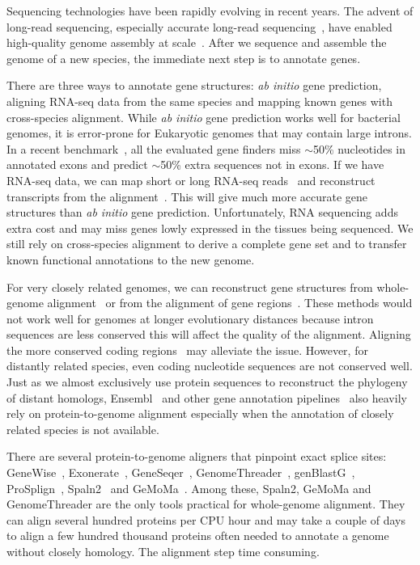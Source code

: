 \documentclass{bioinfo}
\begin{document}
Sequencing technologies have been rapidly evolving in recent years. The advent
of long-read sequencing, especially accurate long-read
sequencing~\citep{Wenger:2019ab}, have enabled high-quality genome assembly at
scale~\citep{Nurk:2020we,Cheng:2021aa,Cheng:2022aa}. After we sequence and
assemble the genome of a new species, the immediate next step is to annotate
genes.

There are three ways to annotate gene structures: \emph{ab initio} gene
prediction, aligning RNA-seq data from the same species and mapping known genes
with cross-species alignment.  While \emph{ab initio} gene prediction works
well for bacterial genomes, it is error-prone for Eukaryotic
genomes that may contain large introns. In a recent
benchmark~\citep{Scalzitti:2020wg}, all the evaluated gene finders miss
$\sim$50\% nucleotides in annotated exons and predict $\sim$50\% extra
sequences not in exons. If we have RNA-seq data, we can map short or long
RNA-seq reads~\citep{Dobin:2013kx,Li:2018ab} and reconstruct transcripts from
the alignment~\citep{Kovaka:2019wf}. This will give much more accurate gene
structures than \emph{ab initio} gene prediction. Unfortunately, RNA sequencing
adds extra cost and may miss genes lowly expressed in the tissues being
sequenced. We still rely on cross-species alignment to derive a complete gene
set and to transfer known functional annotations to the new genome.

For very closely related genomes, we can reconstruct gene structures from
whole-genome alignment~\citep{Fiddes:2018wn} or from the alignment of gene
regions~\citep{Shumate:2020ty}. These methods would not work well for genomes
at longer evolutionary distances because intron sequences are less conserved
this will affect the quality of the alignment. Aligning the more conserved
coding regions~\citep{Li:2007aa,Gotoh:2008aa} may alleviate the issue. However,
for distantly related species, even coding nucleotide sequences are not
conserved well. Just as we almost exclusively use protein sequences to
reconstruct the phylogeny of distant homologs,
Ensembl~\citep{Aken:2016wr} and other gene annotation
pipelines~\citep{Haas:2008tv,Holt:2011tt,Bruna:2021ug} also heavily rely on
protein-to-genome alignment especially when the annotation of closely related
species is not available.

There are several protein-to-genome aligners that pinpoint exact splice sites:
GeneWise~\citep{Birney:1997vr,Birney:2004uy}, Exonerate~\citep{Slater:2005aa},
GeneSeqer~\citep{Usuka:2000vi},
GenomeThreader~\citep{DBLP:journals/infsof/GremmeBSK05},
genBlastG~\citep{She:2011aa}, ProSplign~\citep{Kapustin:2008tq},
Spaln2~\citep{Gotoh:2008aa,Iwata:2012aa} and GeMoMa~\citep{Keilwagen:2019wz}.
Among these, Spaln2, GeMoMa and
GenomeThreader are the only tools practical for whole-genome alignment. They
can align several hundred proteins per CPU hour and may take a couple of days
to align a few hundred thousand proteins often needed to annotate a genome
without closely homology. The alignment step time consuming.
\end{document}
